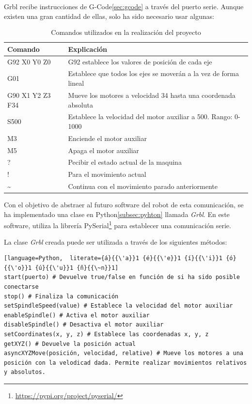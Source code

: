 \indent Grbl recibe instrucciones de G-Code\ref{sec:gcode} a través del puerto serie. Aunque existen una gran 
cantidad de ellas, solo ha sido necesario usar algunas:
\begin{table}[H]
\begin{center}
\begin{tabular}{|l|l|}
\hline
\textbf{Comando} & \textbf{Explicación} \\
\hline
G92 X0 Y0 Z0 & G92 establece los valores de posición de cada eje\\
G01 & Establece que todos los ejes se moverán a la vez de forma lineal  \\
G90 X1 Y2 Z3 F34 & Mueve los motores a velocidad 34 hasta una coordenada absoluta  \\
S500 & Establece la velocidad del motor auxiliar a 500. Rango: 0-1000  \\
M3 & Enciende el motor auxiliar  \\
M5 & Apaga el motor auxiliar  \\
? & Pecibir el estado actual de la maquina  \\
! & Para el movimiento actual \\
\textasciitilde & Continua con el movimiento parado anteriormente \\
\hline
\end{tabular}
\caption{Comandos utilizados en la realización del proyecto}
\end{center}
\end{table}


Con el objetivo de abstraer al futuro software del robot de esta comunicación, se ha implementado 
una clase en Python\ref{subsec:pyhton} llamada \textit{Grbl}. En este software, utiliza la librería 
PySerial\footnote{\url{https://pypi.org/project/pyserial/}} para establecer una comunicación serie.

\noindent La clase \textit{Grbl} creada puede ser utilizada a través de los siguientes métodos:

\begin{lstlisting}[language=Python,  literate={á}{{\'a}}1 {é}{{\'e}}1 {í}{{\'i}}1 {ó}{{\'o}}1 {ú}{{\'u}}1 {ñ}{{\~n}}1]
start(puerto) # Devuelve true/false en función de si ha sido posible conectarse
stop() # Finaliza la comunicación
setSpindleSpeed(value) # Establece la velocidad del motor auxiliar
enableSpindle() # Activa el motor auxiliar
disableSpindle() # Desactiva el motor auxiliar
setCoordinates(x, y, z) # Establece las coordenadas x, y, z 
getXYZ() # Devuelve la posición actual
asyncXYZMove(posición, velocidad, relative) # Mueve los motores a una posición con la velodicad dada. Permite realizar movimientos relativos y absolutos.
\end{lstlisting}

